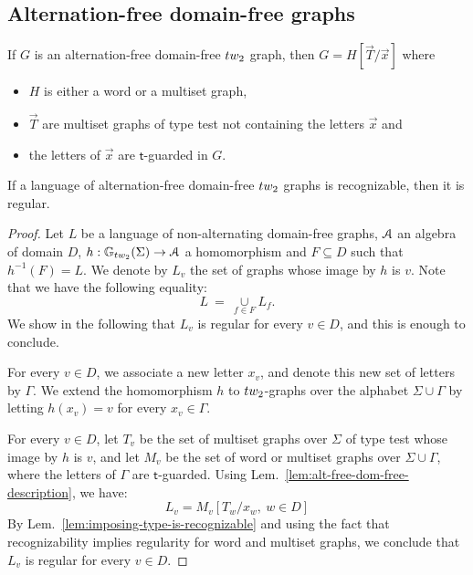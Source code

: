 \subsection{Alternation-free domain-free graphs}

\begin{lemma}\label{lem:alt-free-dom-free-description}
If $G$ is an alternation-free domain-free $\TWT$ graph, then $G=H[\vec{T}/\vec{x}]$ where 
\begin{itemize}
\item $H$ is either a word or a multiset graph,
\item $\vec{T}$ are multiset graphs of type test not containing the letters $\vec{x}$ and 
\item  the  letters of $\vec{x}$ are $\mathsf{t}$-guarded in $G$.
\end{itemize}  
\end{lemma}

\begin{proposition}\label{prop:rec->reg-alt-free-dom-free}
If a language of alternation-free domain-free $\TWT$ graphs is recognizable, then it is regular.
\end{proposition}
\begin{proof}
Let $L$ be a language of non-alternating domain-free graphs, $\mathcal A$ an algebra of domain $D$, $h:\mathbb{G}_\TWT(\Sigma) \to \A$ a homomorphism and $F\subseteq D$ such that $h^{-1}(F)=L$. We denote by $L_v$ the set of graphs whose image by $h$ is $v$. Note that we have the following equality:
 $$L\ =\ \underset{f\in F}{\cup} L_f.$$ 
We show in the following that $L_v$ is regular for every $v\in D$, and this is enough to conclude. 
\medskip

For every $v\in D$, we associate a new letter $x_v$, and denote this new set of letters by $\Gamma$.  We extend the homomorphism $h$ to $\TWT$-graphs over the alphabet $\Sigma \cup \Gamma$ by letting $h(x_v)=v$ for every $x_v\in\Gamma$. 

For every $v\in D$, let $T_{v}$ be the set of multiset graphs over $\Sigma$ of type test  whose image by $h$ is $v$, and let $M_{v}$ be the set of word or multiset graphs over  $\Sigma\cup \Gamma$, where the letters of $\Gamma$ are $\mathsf{t}$-guarded.  Using Lem.~\ref{lem:alt-free-dom-free-description}, we have:
$$ L_v=M_v[T_w/x_w,\  w\in D]$$ 
By Lem.~\ref{lem:imposing-type-is-recognizable} and using the fact that recognizability implies regularity for word and multiset graphs, we conclude that $L_v$ is regular for every $v\in D$.
\end{proof}

